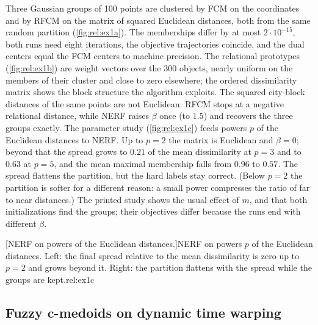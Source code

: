 Three Gaussian groups of 100 points are clustered by FCM on the coordinates and by RFCM on the matrix of squared Euclidean distances, both from the same random partition (\cref{fig:rel:ex1a}). The memberships differ by at most $2\cdot10^{-15}$, both runs need eight iterations, the objective trajectories coincide, and the dual centers equal the FCM centers to machine precision. The relational prototypes (\cref{fig:rel:ex1b}) are weight vectors over the 300 objects, nearly uniform on the members of their cluster and close to zero elsewhere; the ordered dissimilarity matrix shows the block structure the algorithm exploits. The squared city-block distances of the same points are not Euclidean: RFCM stops at a negative relational distance, while NERF raises $\beta$ once (to $1.5$) and recovers the three groups exactly. The parameter study (\cref{fig:rel:ex1c}) feeds powers $p$ of the Euclidean distances to NERF. Up to $p=2$ the matrix is Euclidean and $\beta=0$; beyond that the spread grows to $0.21$ of the mean dissimilarity at $p=3$ and to $0.63$ at $p=5$, and the mean maximal membership falls from $0.96$ to $0.57$. The spread flattens the partition, but the hard labels stay correct. (Below $p=2$ the partition is softer for a different reason: a small power compresses the ratio of far to near distances.) The printed study shows the usual effect of $m$, and that both initializations find the groups; their objectives differ because the runs end with different $\beta$.

[NERF on powers of the Euclidean distances.]{NERF on powers $p$ of the Euclidean distances. Left: the final spread relative to the mean dissimilarity is zero up to $p=2$ and grows beyond it. Right: the partition flattens with the spread while the groups are kept.}{rel:ex1c}

\subsection{Fuzzy c-medoids on dynamic time warping}

